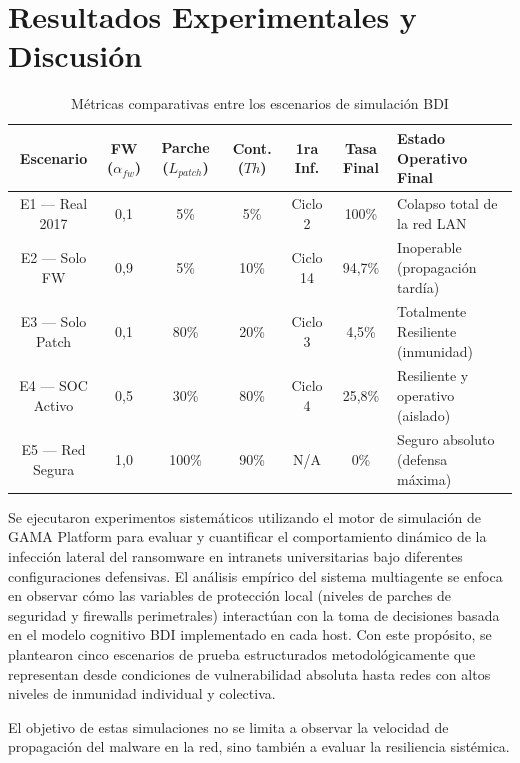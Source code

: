 \section{Resultados Experimentales y Discusión}
\label{sec:resultados}

\begin{table}[!t]
\caption{Métricas comparativas entre los escenarios de simulación BDI}
\label{tab:comparativo_escenarios}
\begin{center}
\begin{tabular}{|c|c|c|c|c|c|l|}
\hline
\textbf{Escenario} & \textbf{FW} ($\alpha_{fw}$) & \textbf{Parche} ($L_{patch}$) & \textbf{Cont.} ($Th$) & \textbf{1ra Inf.} & \textbf{Tasa Final} & \textbf{Estado Operativo Final} \\ \hline
E1 — Real 2017 & 0,1 & 5\% & 5\% & Ciclo 2 & 100\% & Colapso total de la red LAN \\ \hline
E2 — Solo FW & 0,9 & 5\% & 10\% & Ciclo 14 & 94,7\% & Inoperable (propagación tardía) \\ \hline
E3 — Solo Patch & 0,1 & 80\% & 20\% & Ciclo 3 & 4,5\% & Totalmente Resiliente (inmunidad) \\ \hline
E4 — SOC Activo & 0,5 & 30\% & 80\% & Ciclo 4 & 25,8\% & Resiliente y operativo (aislado) \\ \hline
E5 — Red Segura & 1,0 & 100\% & 90\% & N/A & 0\% & Seguro absoluto (defensa máxima) \\ \hline
\end{tabular}
\end{center}
\end{table}

Se ejecutaron experimentos sistemáticos utilizando el motor de simulación de GAMA Platform para evaluar y cuantificar el comportamiento dinámico de la infección lateral del ransomware en intranets universitarias bajo diferentes configuraciones defensivas. El análisis empírico del sistema multiagente se enfoca en observar cómo las variables de protección local (niveles de parches de seguridad y firewalls perimetrales) interactúan con la toma de decisiones basada en el modelo cognitivo BDI implementado en cada host. Con este propósito, se plantearon cinco escenarios de prueba estructurados metodológicamente que representan desde condiciones de vulnerabilidad absoluta hasta redes con altos niveles de inmunidad individual y colectiva.

El objetivo de estas simulaciones no se limita a observar la velocidad de propagación del malware en la red, sino también a evaluar la resiliencia sistémica.

